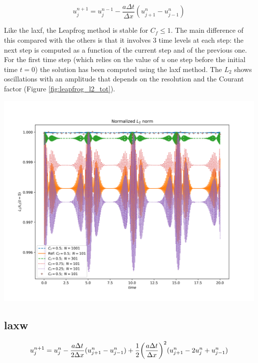 \documentclass[11pt, a4paper]{article}
\begin{document}
\begin{equation} \label{eq:leapfrog}
    u^{n+1}_j = u^{n-1}_j - \frac{a \Delta t}{\Delta x} (u^n_{j+1} - u^n_{j-1})
\end{equation}

Like the \acrshort{laxf}, the Leapfrog method is stable for \(C_f \leq 1\). The
main difference of this compared with the others is that it involves 3 time
levels at each step: the next step is computed as a function of the current
step and of the previous one. For the first time step (which relies on the
value of \(u\) one step before the initial time \(t = 0\)) the solution has
been computed using the \acrshort{laxf} method. The \(L_2\) shows oscillations
with an amplitude that depends on the resolution and the Courant factor (Figure
\ref{fig:leapfrog_l2_tot}).

\begin{center}
    \centering
    \includegraphics[width=0.9\linewidth]{images/L2_GAUS_LEAPFROG.png}
    \label{fig:leapfrog_l2_tot}
\end{center}

\subsection{\acrfull{laxw}}

\begin{equation} \label{eq:lax-w}
    u^{n+1}_j = u^n_j - \frac{a \Delta t}{2 \Delta x} (u^n_{j+1} - u^n_{j-1}) + \frac{1}{2}\qty(\frac{a \Delta t}{\Delta x})^2 (u^n_{j+1} - 2u^n_j + u^n_{j-1})
\end{equation}
\end{document}
